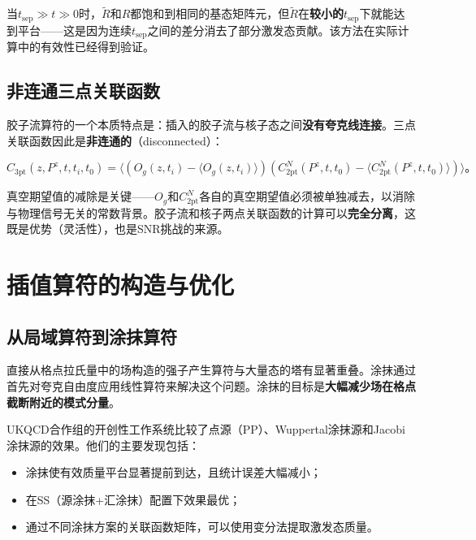 \documentclass[12pt,a4paper]{ctexart}
\theoremstyle{definition}
\begin{document}
当$t_{\text{sep}} \gg t \gg 0$时，$\tilde{R}$和$R$都饱和到相同的基态矩阵元，但$\tilde{R}$在\textbf{较小的$t_{\text{sep}}$}下就能达到平台——这是因为连续$t_{\text{sep}}$之间的差分消去了部分激发态贡献。该方法在实际计算中的有效性已经得到验证\cite{Fan2018gluon}。

\subsection{非连通三点关联函数}

胶子流算符的一个本质特点是：插入的胶子流与核子态之间\textbf{没有夸克线连接}\cite{Chen2025gluon,NoteGluonPDFs}。三点关联函数因此是\textbf{非连通的}（disconnected）：

\begin{equation}
\boxed{C_{\text{3pt}}(z, P^z, t, t_i, t_0) = \langle (O_g(z, t_i) - \langle O_g(z, t_i) \rangle)(C^N_{\text{2pt}}(P^z, t, t_0) - \langle C^N_{\text{2pt}}(P^z, t, t_0) \rangle) \rangle}。
\label{eq:disconnected_3pt}
\end{equation}

真空期望值的减除是关键——$O_g$和$C^N_{\text{2pt}}$各自的真空期望值必须被单独减去，以消除与物理信号无关的常数背景。胶子流和核子两点关联函数的计算可以\textbf{完全分离}，这既是优势（灵活性），也是SNR挑战的来源\cite{NoteGluonPDFs}。

\section{插值算符的构造与优化}

\subsection{从局域算符到涂抹算符}

直接从格点拉氏量中的场构造的强子产生算符与大量态的塔有显著重叠\cite{Peardon2009}。涂抹通过首先对夸克自由度应用线性算符来解决这个问题。涂抹的目标是\textbf{大幅减少场在格点截断附近的模式分量}。

UKQCD合作组\cite{UKQCD1993}的开创性工作系统比较了点源（PP）、Wuppertal涂抹源和Jacobi涂抹源的效果。他们的主要发现包括：

\begin{itemize}
    \item 涂抹使有效质量平台显著提前到达，且统计误差大幅减小；
    \item 在SS（源涂抹+汇涂抹）配置下效果最优；
    \item 通过不同涂抹方案的关联函数矩阵，可以使用变分法提取激发态质量。
\end{itemize}
\end{document}
